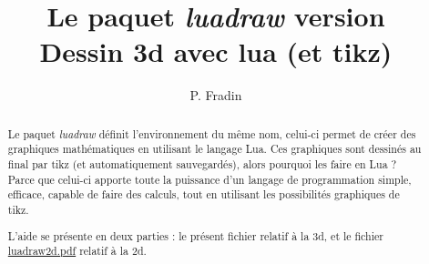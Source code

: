 \documentclass[%
10pt,%
a4paper,%
french,%
]%
{article}%
\title{\textbf{Le paquet} \emph{luadraw} version \version\\ Dessin 3d avec lua (et tikz)}
\author{P. Fradin}
\begin{document}
\maketitle


\begin{abstract}
Le paquet \emph{luadraw} définit l'environnement du même nom, celui-ci permet de créer des graphiques mathématiques en utilisant le langage Lua. Ces graphiques sont dessinés au final par tikz (et automatiquement sauvegardés), alors pourquoi les faire en Lua ? Parce que celui-ci apporte toute la puissance d'un langage de programmation simple, efficace, capable de faire des calculs, tout en utilisant les possibilités graphiques de tikz.

L'aide se présente en deux parties : le présent fichier relatif à la 3d, et le fichier \href{file://luadraw2d.pdf}{luadraw2d.pdf} relatif à la 2d.
\end{abstract}

\begin{multicols}{2}
\tableofcontents
\end{multicols}

\clearpage

\listoffigures

\clearpage

\renewcommand{\labelitemi}{$\bullet$}
\renewcommand{\labelitemii}{--}
\renewcommand{\labelitemiii}{$*$}
\renewcommand{\thesection}{\Roman{section}~}
\renewcommand{\thesubsection}{\arabic{subsection})}
\renewcommand{\thesubsubsection}{\arabic{subsection}.\arabic{subsubsection}}
\renewcommand{\thefigure}{\arabic{figure}}
\end{document}
